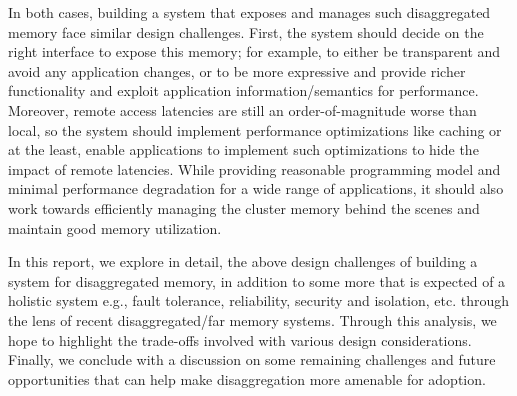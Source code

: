 In both cases, building a system 
that exposes and manages such disaggregated memory face  
similar design challenges. First, the system should decide on
the right interface to expose this memory; for example,
to either be transparent and avoid any application changes, 
or to be more expressive and provide richer functionality and 
exploit application information/semantics for performance. 
Moreover, remote access 
latencies are still an order-of-magnitude worse than local, so the 
system should implement performance optimizations like caching 
or at the least, enable applications to implement such optimizations
to hide the impact of remote latencies. 
While providing reasonable programming model and minimal 
performance degradation
for a wide range of applications, it should also work towards 
efficiently managing the cluster memory behind the scenes and 
maintain good memory utilization. 

In this report, we explore in 
detail, the above design 
challenges of building a system for disaggregated memory, 
in addition to some more that is expected of a holistic 
system e.g., fault tolerance, reliability, security and 
isolation, etc. through the lens of recent disaggregated/far 
memory systems. Through this analysis, we hope to 
highlight the trade-offs involved with various design 
considerations. Finally, we conclude with a discussion on 
some remaining challenges and future opportunities that 
can help make disaggregation more amenable for adoption. 